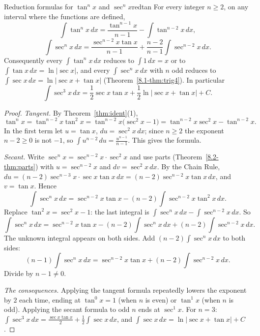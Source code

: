 \documentclass[11pt]{article}
\begin{document}
\begin{thm}{Reduction formulas for $\tan^nx$ and $\sec^nx$}{redtan}
For every integer $n\ge2$, on any interval where the functions are defined,
\[\int\tan^nx\,dx=\frac{\tan^{n-1}x}{n-1}-\int\tan^{n-2}x\,dx,\]
\[\int\sec^nx\,dx=\frac{\sec^{n-2}x\tan x}{n-1}+\frac{n-2}{n-1}\int\sec^{n-2}x\,dx .\]
Consequently every $\int\tan^nx\,dx$ reduces to $\int1\,dx=x$ or to $\int\tan x\,dx=\ln\lvert\sec x\rvert$, and every $\int\sec^nx\,dx$ with $n$ odd reduces to $\int\sec x\,dx=\ln\lvert\sec x+\tan x\rvert$ (Theorem~\ref{8.1-thm:trig4}). In particular
\[\int\sec^3x\,dx=\frac12\sec x\tan x+\frac12\ln\lvert\sec x+\tan x\rvert+C .\]
\end{thm}
\begin{proof}
\emph{Tangent.} By Theorem~\ref{thm:ident}(1),
\[\tan^nx=\tan^{n-2}x\tan^2x=\tan^{n-2}x\big(\sec^2x-1\big)=\tan^{n-2}x\sec^2x-\tan^{n-2}x .\]
In the first term let $u=\tan x$, $du=\sec^2x\,dx$; since $n\ge2$ the exponent $n-2\ge0$ is not $-1$, so $\int u^{n-2}\,du=\frac{u^{n-1}}{n-1}$. This gives the formula.

\emph{Secant.} Write $\sec^nx=\sec^{n-2}x\cdot\sec^2x$ and use parts (Theorem~\ref{8.2-thm:parts}) with $u=\sec^{n-2}x$ and $dv=\sec^2x\,dx$. By the Chain Rule, $du=(n-2)\sec^{n-3}x\cdot\sec x\tan x\,dx=(n-2)\sec^{n-2}x\tan x\,dx$, and $v=\tan x$. Hence
\[\int\sec^nx\,dx=\sec^{n-2}x\tan x-(n-2)\int\sec^{n-2}x\tan^2x\,dx .\]
Replace $\tan^2x=\sec^2x-1$: the last integral is $\int\sec^nx\,dx-\int\sec^{n-2}x\,dx$. So
\[\int\sec^nx\,dx=\sec^{n-2}x\tan x-(n-2)\int\sec^nx\,dx+(n-2)\int\sec^{n-2}x\,dx .\]
The unknown integral appears on both sides. Add $(n-2)\int\sec^nx\,dx$ to both sides:
\[(n-1)\int\sec^nx\,dx=\sec^{n-2}x\tan x+(n-2)\int\sec^{n-2}x\,dx .\]
Divide by $n-1\ne0$.

\emph{The consequences.} Applying the tangent formula repeatedly lowers the exponent by $2$ each time, ending at $\tan^0x=1$ (when $n$ is even) or $\tan^1x$ (when $n$ is odd). Applying the secant formula to odd $n$ ends at $\sec^1x$. For $n=3$: $\int\sec^3x\,dx=\frac{\sec x\tan x}2+\frac12\int\sec x\,dx$, and $\int\sec x\,dx=\ln\lvert\sec x+\tan x\rvert+C$.
\end{proof}
\end{document}
